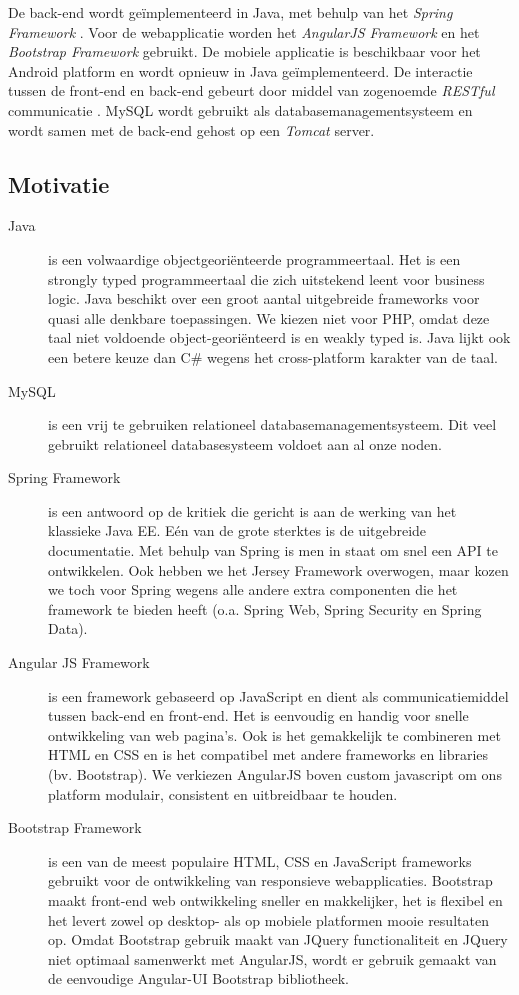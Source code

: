 \documentclass[a4paper]{article}
\begin{document}
De back-end wordt geïmplementeerd in Java, met behulp van het \textit{Spring Framework} \cite{Spring}. Voor de webapplicatie worden het \textit{AngularJS Framework} \cite{AngularJS} en het \textit{Bootstrap Framework} \cite{Bootstrap} gebruikt. De mobiele applicatie is beschikbaar voor het Android platform en wordt opnieuw in Java geïmplementeerd. De interactie tussen de front-end en back-end gebeurt door middel van zogenoemde \textit{RESTful} communicatie \cite{REST}. MySQL \cite{MySQL} wordt gebruikt als databasemanagementsysteem en wordt samen met de back-end gehost op een \textit{Tomcat} \cite{Tomcat} server.

\newpage
\subsection{Motivatie}
\begin{description}
    \item[Java] is een volwaardige objectgeoriënteerde programmeertaal. Het is een strongly typed programmeertaal die zich uitstekend leent voor business logic. Java beschikt over een groot aantal uitgebreide frameworks voor quasi alle denkbare toepassingen. We kiezen niet voor PHP, omdat deze taal niet voldoende object-georiënteerd is en weakly typed is. Java lijkt ook een betere keuze dan C\# wegens het cross-platform karakter van de taal.
    \item[MySQL] is een vrij te gebruiken relationeel databasemanagementsysteem. Dit veel gebruikt relationeel databasesysteem voldoet aan al onze noden.
    \item[Spring Framework] is een antwoord op de kritiek die gericht is aan de werking van het klassieke Java EE. Eén van de grote sterktes is de uitgebreide documentatie. Met behulp van Spring is men in staat om snel een API te ontwikkelen. Ook hebben we het Jersey Framework overwogen, maar kozen we toch voor Spring wegens alle andere extra componenten die het framework te bieden heeft (o.a. Spring Web, Spring Security en Spring Data).
    \item[Angular JS Framework] is een framework gebaseerd op JavaScript en dient als communicatiemiddel tussen back-end en front-end. Het is eenvoudig en handig voor snelle ontwikkeling van web pagina's. Ook is het gemakkelijk te combineren met HTML en CSS en is het compatibel met andere frameworks en libraries (bv. Bootstrap). We verkiezen AngularJS boven custom javascript om ons platform modulair, consistent en uitbreidbaar te houden.
    \item[Bootstrap Framework] is een van de meest populaire HTML, CSS en JavaScript frameworks gebruikt voor de ontwikkeling van responsieve webapplicaties. Bootstrap maakt front-end web ontwikkeling sneller en makkelijker, het is flexibel en het levert zowel op desktop- als op mobiele platformen mooie resultaten op. Omdat Bootstrap gebruik maakt van JQuery functionaliteit en JQuery niet optimaal samenwerkt met AngularJS, wordt er gebruik gemaakt van de eenvoudige Angular-UI \cite{AngularUI} Bootstrap bibliotheek. 
\end{description}
\end{document}
